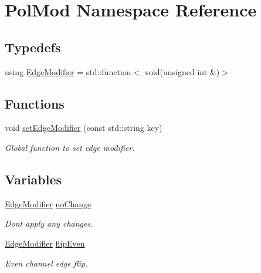 \hypertarget{namespace_pol_mod}{}\section{Pol\+Mod Namespace Reference}
\label{namespace_pol_mod}
\subsection*{Typedefs}
\begin{DoxyCompactItemize}
\item 
using \hyperlink{namespace_pol_mod_a85db6c8495e67b2d486ea7dcf7f6aad4}{Edge\+Modifier} = std\+::function$<$ void(unsigned int \&)$>$
\end{DoxyCompactItemize}
\subsection*{Functions}
\begin{DoxyCompactItemize}
\item 
void \hyperlink{namespace_pol_mod_afc8b6cf3366cdb9a14e5ae6d2f2e8326}{set\+Edge\+Modifier} (const std\+::string key)
\begin{DoxyCompactList}\small\item\em Global function to set edge modifier. \end{DoxyCompactList}\end{DoxyCompactItemize}
\subsection*{Variables}
\begin{DoxyCompactItemize}
\item 
\hyperlink{namespace_pol_mod_a85db6c8495e67b2d486ea7dcf7f6aad4}{Edge\+Modifier} \hyperlink{namespace_pol_mod_a3bf89c0439812d613ba363a866c30817}{no\+Change}
\begin{DoxyCompactList}\small\item\em Don\textquotesingle{}t apply any changes. \end{DoxyCompactList}\item 
\hyperlink{namespace_pol_mod_a85db6c8495e67b2d486ea7dcf7f6aad4}{Edge\+Modifier} \hyperlink{namespace_pol_mod_ae33c3fdc58614d743b65a5db0859b6a7}{flip\+Even}
\begin{DoxyCompactList}\small\item\em Even channel edge flip. \end{DoxyCompactList}\end{DoxyCompactItemize}


